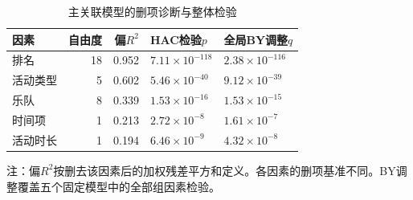 \begin{table}[!htbp]
\centering\small
\caption{主关联模型的删项诊断与整体检验}\label{tab:factors}
\setlength{\tabcolsep}{4pt}
\renewcommand{\arraystretch}{1.15}
\begin{tabularx}{\linewidth}{L r r L L}
\toprule
因素 & 自由度 & 偏$R^2$ & HAC检验$p$ & 全局BY调整$q$ \\
\midrule
排名 & 18 & 0.952 & $7.11\times10^{-118}$ & $2.38\times10^{-116}$ \\
活动类型 & 5 & 0.602 & $5.46\times10^{-40}$ & $9.12\times10^{-39}$ \\
乐队 & 8 & 0.339 & $1.53\times10^{-16}$ & $1.53\times10^{-15}$ \\
时间项 & 1 & 0.213 & $2.72\times10^{-8}$ & $1.61\times10^{-7}$ \\
活动时长 & 1 & 0.194 & $6.46\times10^{-9}$ & $4.32\times10^{-8}$ \\
\bottomrule
\end{tabularx}
\par\vspace{4pt}
\begin{minipage}{\linewidth}\footnotesize{}
注：偏$R^2$按删去该因素后的加权残差平方和定义。各因素的删项基准不同。BY调整覆盖五个固定模型中的全部\NumTests{}组因素检验。
\end{minipage}
\end{table}
